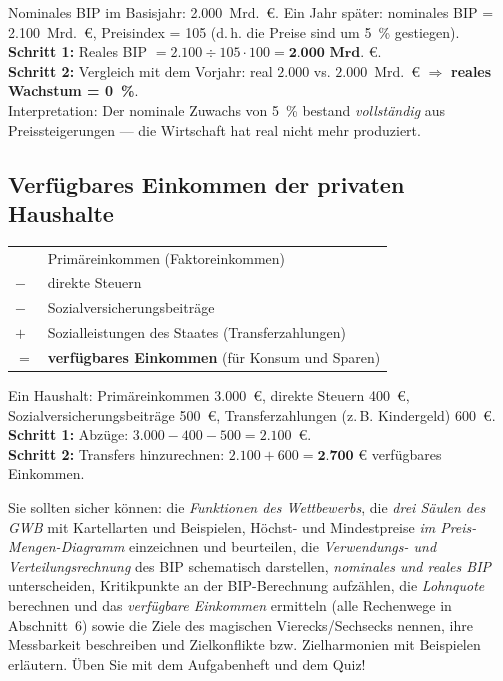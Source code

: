 \documentclass[11pt, a4paper]{article}
\begin{document}
\begin{beispiel}
Nominales BIP im Basisjahr: 2.000~Mrd.~€. Ein Jahr später: nominales BIP =
2.100~Mrd.~€, Preisindex = 105 (d.\,h. die Preise sind um 5~\% gestiegen).\\[0.3em]
\textbf{Schritt 1:} Reales BIP $= 2.100 \div 105 \cdot 100 = \textbf{2.000~Mrd.~€}$.\\
\textbf{Schritt 2:} Vergleich mit dem Vorjahr: real $2.000$ vs. $2.000$~Mrd.~€
$\Rightarrow$ \textbf{reales Wachstum = 0~\%}.\\[0.3em]
Interpretation: Der nominale Zuwachs von 5~\% bestand \emph{vollständig} aus
Preissteigerungen --- die Wirtschaft hat real nicht mehr produziert.
\end{beispiel}

\subsection{Verfügbares Einkommen der privaten Haushalte}

\begin{merksatz}[title={\bfseries Schema: verfügbares Einkommen}]
\begin{tabular}{ll}
  & Primäreinkommen (Faktoreinkommen)\\
$-$ & direkte Steuern\\
$-$ & Sozialversicherungsbeiträge\\
$+$ & Sozialleistungen des Staates (Transferzahlungen)\\
\midrule
$=$ & \textbf{verfügbares Einkommen} (für Konsum und Sparen)
\end{tabular}
\end{merksatz}

\begin{beispiel}
Ein Haushalt: Primäreinkommen 3.000~€, direkte Steuern 400~€,
Sozialversicherungsbeiträge 500~€, Transferzahlungen (z.\,B. Kindergeld) 600~€.\\[0.3em]
\textbf{Schritt 1:} Abzüge: $3.000 - 400 - 500 = 2.100$~€.\\
\textbf{Schritt 2:} Transfers hinzurechnen: $2.100 + 600 = \textbf{2.700~€}$
verfügbares Einkommen.
\end{beispiel}

\begin{merksatz}[title={\bfseries Wichtig für die Prüfungsvorbereitung}]
Sie sollten sicher können: die \emph{Funktionen des Wettbewerbs}, die \emph{drei Säulen
des GWB} mit Kartellarten und Beispielen, Höchst- und Mindestpreise \emph{im
Preis-Mengen-Diagramm} einzeichnen und beurteilen, die \emph{Verwendungs- und
Verteilungsrechnung} des BIP schematisch darstellen, \emph{nominales und reales BIP}
unterscheiden, Kritikpunkte an der BIP-Berechnung aufzählen, die \emph{Lohnquote}
berechnen und das \emph{verfügbare Einkommen} ermitteln (alle Rechenwege in
Abschnitt~6) sowie die Ziele des magischen
Vierecks/Sechsecks nennen, ihre Messbarkeit beschreiben und Zielkonflikte bzw.
Zielharmonien mit Beispielen erläutern. Üben Sie mit dem Aufgabenheft und dem Quiz!
\end{merksatz}
\end{document}
